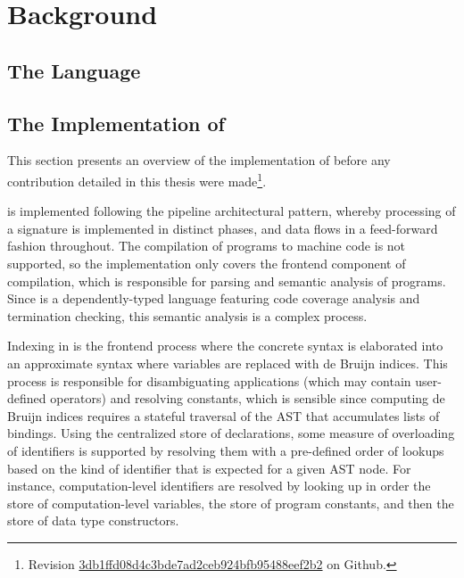 \chapter{Background}

\section{The \Beluga Language}

\section{The Implementation of \Beluga}

This section presents an overview of the implementation of \Beluga before any contribution detailed in this thesis were made\footnote{Revision \href{https://github.com/Beluga-lang/Beluga/tree/4769323d701722bde42a0e2570d892ef78cd2d04}{3db1ffd08d4c3bde7ad2ceb924bfb95488eef2b2} on Github.}.

\Beluga is implemented following the pipeline architectural pattern, whereby processing of a \Beluga signature is implemented in distinct phases, and data flows in a feed-forward fashion throughout.
The compilation of \Beluga programs to machine code is not supported, so the implementation only covers the frontend component of compilation, which is responsible for parsing and semantic analysis of programs.
Since \Beluga is a dependently-typed language featuring code coverage analysis and termination checking, this semantic analysis is a complex process.


Indexing in \Beluga is the frontend process where the concrete syntax is elaborated into an approximate syntax where variables are replaced with de Bruijn indices.
This process is responsible for disambiguating applications (which may contain user-defined operators) and resolving constants, which is sensible since computing de Bruijn indices requires a stateful traversal of the \ac{AST} that accumulates lists of bindings.
Using the centralized store of declarations, some measure of overloading of identifiers is supported by resolving them with a pre-defined order of lookups based on the kind of identifier that is expected for a given \ac{AST} node.
For instance, computation-level identifiers are resolved by looking up in order the store of computation-level variables, the store of program constants, and then the store of data type constructors.

